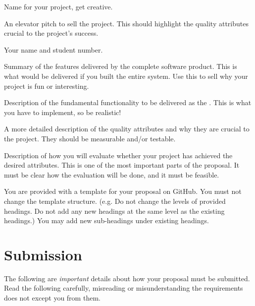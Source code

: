 \documentclass{csse4400}
\begin{document}
\begin{description}[topsep=7pt,partopsep=2pt,itemsep=4pt,parsep=4pt]
    \item[Title] Name for your project, get creative.
    \item[Abstract] An elevator pitch to sell the project.
                    This should highlight the quality attributes crucial to the project's success.
    \item[Author] Your name and student number.
    \item[Functionality] Summary of the features delivered by the complete software product.
                         This is what would be delivered if you built the entire system.
                         Use this to sell why your project is fun or interesting.
    \item[Scope] Description of the fundamental functionality to be delivered as the .
                 This is what you have to implement, so be realistic!
    \item[Quality Attributes] A more detailed description of the quality attributes and why they are crucial to the project.
                              They should be measurable and/or testable.
    \item[Evaluation] Description of how you will evaluate whether your project has achieved the desired attributes.
                      This is one of the most important parts of the proposal.
                      It must be clear how the evaluation will be done, and it must be feasible.
\end{description}

\noindent
You are provided with a template for your proposal on GitHub.
You must not change the template structure.
(e.g. Do not change the levels of provided headings.
Do not add any new headings at the same level as the existing headings.)
You may add new sub-headings under existing headings.


\section{Submission}

The following are \emph{important} details about how your proposal must be submitted.
Read the following carefully, misreading or misunderstanding the requirements does not except you from them.
\end{document}
